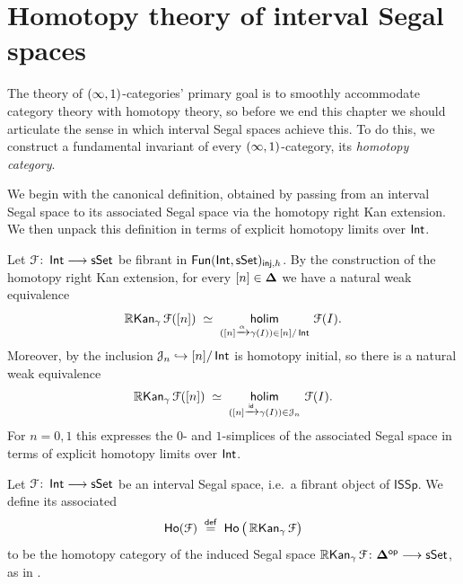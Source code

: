 \section{Homotopy theory of interval Segal spaces}
\label{ch2:: sec: homotopy theory int}

The theory of $(\operatorname{\infty},1)$-categories' primary goal is to smoothly accommodate category theory with homotopy theory, so before we end this chapter we should articulate the sense in which interval Segal spaces achieve this. To do this, we construct a fundamental invariant of every $(\operatorname{\infty},1)$-category, its \emph{homotopy category}. 

We begin with the canonical definition, obtained by passing from an interval Segal space to its associated Segal space via the homotopy right Kan extension. We then unpack this definition in terms of explicit homotopy limits over $\operatorname{\mathsf{Int}}$.

\begin{observation}\label{ch2:: obs: RRkan-gamma-pointwise}
Let \(\mathcal F \colon \operatorname{\mathsf{Int}} \longrightarrow \operatorname{\sf sSet}\) be fibrant in
\(\operatorname{{\sf Fun}}(\operatorname{\mathsf{Int}},\operatorname{\sf sSet})_{\operatorname{\mathsf{inj}},h}\).
By the construction of the homotopy right Kan extension, for every
\([n]\in \mathbf\Delta\) we have a natural weak equivalence
\begin{equation}
  \Rrkan_{\gamma} \cF([n])
  \;\simeq\;
  \hoLimit[([n]\xra{\alpha}\gamma(I))\in [n]/\Int] \cF(I).
\end{equation}
Moreover, by  the inclusion
\(\mathcal J_n \hookrightarrow [n]/\operatorname{\mathsf{Int}}\) is homotopy initial, so there is a
natural weak equivalence
\begin{equation}
  \Rrkan_{\gamma} \cF([n])
  \;\simeq\;
  \hoLimit[([n]\xra{\id}\gamma(I))\in \cJ_n] \cF(I).
\end{equation}
For \(n=0,1\) this expresses the \(0\)- and \(1\)-simplices of the
associated Segal space in terms of explicit homotopy limits over \(\operatorname{\mathsf{Int}}\).
\end{observation}


\begin{definition}\label{ch2:: def: homotopy category ISSP}
  Let \(\mathcal F\colon \operatorname{\mathsf{Int}} \longrightarrow \operatorname{\sf sSet}\) be an interval Segal space, i.e.\ a
  fibrant object of \(\mathsf{ISSp}\).
  We define its associated 
  \begin{equation}
    \operatorname{\sf Ho}(\mathcal F) \;\overset{\mathsf{def}}{=}\;
    \operatorname{\sf Ho}\big(\operatorname{\mathbb{R}\mathsf{Kan}}_{\gamma}\mathcal F\big)
  \end{equation}
  to be the homotopy category of the induced Segal space
  \(\operatorname{\mathbb{R}\mathsf{Kan}}_{\gamma}\mathcal F\colon \mathbf\Delta^{\mathsf{op}}\longrightarrow \operatorname{\sf sSet}\), as in
  .
\end{definition}



